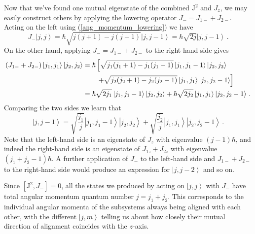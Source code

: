 \documentclass{article}
\theoremstyle{plain}\theoremheaderfont{\normalfont\itshape}\theorembodyfont{\rmfamily}\theoremseparator{.}\newtheorem*{rem}{Remark}\newtheorem*{ex}{Example}\newtheorem*{proof}{Proof}\newtheorem*{altp}{Alternative proof}
\theoremstyle{plain}\theoremheaderfont{\normalfont\bfseries}\theorembodyfont{\rmfamily}\theoremseparator{.}\newtheorem{thm}{Theorem}[section]\newtheorem{lem}[thm]{Lemma}\newtheorem{prop}[thm]{Proposition}\newtheorem*{cor}{Corollary}\newtheorem{defn}[thm]{Definition}\newtheorem{clm}[thm]{Claim}\newtheorem{clminproof}{Claim}
\theoremstyle{break}\theoremheaderfont{\normalfont\itshape}\theorembodyfont{\rmfamily}\theoremseparator{.\medskip}\newtheorem*{proofskip}{Proof}\newtheorem*{exs}{Examples}\newtheorem*{rems}{Remarks}
\theoremstyle{break}\theoremheaderfont{\normalfont\bfseries}\theorembodyfont{\rmfamily}\theoremseparator{.\medskip}\newtheorem{lemskip}[thm]{Lemma}\newtheorem{defnskip}[thm]{Definition}\newtheorem{propskip}[thm]{Proposition}\newtheorem{thmskip}[thm]{Theorem}
\numberwithin{equation}{section}
\newcommand{\ket}[1]{\left| #1 \right\rangle}
\newcommand{\vb}[1]{\bm{\mathrm{#1}}}
\begin{document}
    Now that we've found one mutual eigenstate of the combined \(\vb{J}^2\) and \(J_z\), we may easily construct others by applying the lowering operator \(J_-=J_{1-}+J_{2-}\). Acting on the left using (\ref{ang_momentum_lowering}) we have
    \begin{equation}
        J_-\ket{j,j}=\hbar\sqrt{j(j+1)-j(j-1)}\ket{j,j-1}=\hbar\sqrt{2j}\ket{j,j-1}\,.
    \end{equation}
    On the other hand, applying \(J_-=J_{1-}+J_{2-}\) to the right-hand side gives
    \begin{align}
        (J_{1-}+J_{2-})\ket{j_1,j_1}\ket{j_2,j_2}&=\hbar\left[\sqrt{j_1(j_1+1)-j_1(j_1-1)}\ket{j_1,j_1-1}\ket{j_2,j_2}\right.\notag\\
        &\qquad\left.+\sqrt{j_2(j_2+1)-j_2(j_2-1)}\ket{j_1,j_1}\ket{j_2,j_2-1}\right]\notag\\
        &=\hbar\sqrt{2j_1}\ket{j_1,j_1-1}\ket{j_2,j_2}+\hbar\sqrt{2j_2}\ket{j_1,j_1}\ket{j_2,j_2-1}\,.
    \end{align}
    Comparing the two sides we learn that
    \begin{equation}
        \ket{j,j-1}=\sqrt{\frac{j_1}{j}}\ket{j_1,j_1-1}\ket{j_2,j_2}+\sqrt{\frac{j_2}{j}}\ket{j_1,j_1}\ket{j_2,j_2-1}\,.
    \end{equation}
    Note that the left-hand side is an eigenstate of \(J_z\) with eigenvalue \((j-1)\hbar\), and indeed the right-hand side is an eigenstate of \(J_{1z}+J_{2z}\) with eigenvalue \((j_1+j_2-1)\hbar\). A further application of \(J_-\) to the left-hand side and \(J_{1-}+J_{2-}\) to the right-hand side would produce an expression for \(\ket{j,j-2}\) and so on.

    Since \([\vb{J}^2,J_-]=0\), all the states we produced by acting on \(\ket{j,j}\) with \(J_-\) have total angular momentum quantum number \(j=j_1+j_2\). This corresponds to the individual angular momenta of the subsystems always being aligned with each other, with the different \(\ket{j,m}\) telling us about how closely their mutual direction of alignment coincides with the \(z\)-axis.
\end{document}
